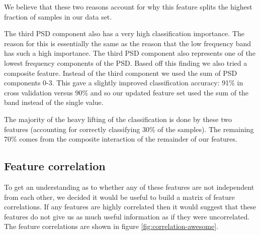 \documentclass[ %
                    author={Sam Phippen},
                supervisor={Dr. Rafal Bogacz},
                     title={Real time voice activity detectors in noisy personal computing environments},
                  subtitle={},
                    degree={MEng},
                      year={2012} ]{thesis}
\begin{document}
We believe that these two reasons account for why this feature splits the
highest fraction of samples in our data set.

The third PSD component also has a very high classification importance. The
reason for this is essentially the same as the reason that the low frequency
band has such a high importance. The third PSD component also represents one of
the lowest frequency components of the PSD. Based off this finding we also
tried a composite feature. Instead of the third component we used the sum of
PSD components 0-3. This gave a slightly improved classification accuracy: 91\%
in cross validation versus 90\% and so our updated feature set used the sum of
the band instead of the single value.

The majority of the heavy lifting of the classification is done by these two
features (accounting for correctly classifying 30\% of the samples). The
remaining 70\% comes from the composite interaction of the remainder of our
features.

\subsection{Feature correlation}

To get an understanding as to whether any of these features are not independent
from each other, we decided it would be useful to build a matrix of feature
correlations. If any features are highly correlated then it would suggest that
these features do not give us as much useful information as if they were
uncorrelated. The feature correlations are shown in figure
\ref{fig:correlation-awesome}.
\end{document}
